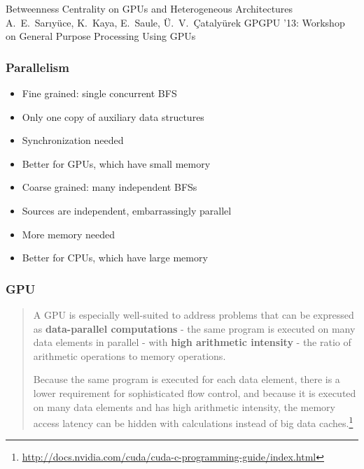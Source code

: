 
\begin{frame}
  \centering
  \vfill
  {\huge Betweenness Centrality on GPUs and Heterogeneous Architectures}
  \vfill
  {\Large A.~E.~Sar\i y\"uce, K.~Kaya, E.~Saule, \"U.~V.~\c{C}ataly\"urek}
  \vfill
  {\large GPGPU '13: Workshop on General Purpose Processing Using GPUs}
  \vfill
\end{frame}

\begin{frame}
  \frametitle{Parallelism}

  \begin{itemize}
    \item Fine grained: single concurrent BFS
    \item Only one copy of auxiliary data structures
    \item Synchronization needed
    \item Better for GPUs, which have small memory
  \end{itemize}
  \begin{itemize}
    \item Coarse grained: many independent BFSs
    \item Sources are independent, embarrassingly parallel
    \item More memory needed
    \item Better for CPUs, which have large memory
  \end{itemize}
\end{frame}

\begin{frame}
  \frametitle{GPU}

  \begin{quote}
    A GPU is especially well-suited to address problems that can be expressed as \textbf{data-parallel computations} - the same program is executed on many data elements in parallel - with \textbf{high arithmetic intensity} - the ratio of arithmetic operations to memory operations.

    Because the same program is executed for each data element, there is a lower requirement for sophisticated flow control, and because it is executed on many data elements and has high arithmetic intensity, the memory access latency can be hidden with calculations instead of big data caches.\footnote{\url{http://docs.nvidia.com/cuda/cuda-c-programming-guide/index.html}}
  \end{quote}
\end{frame}


